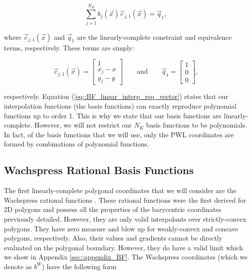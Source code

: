 \begin{equation}
\sum_{j=1}^{N_K}  b_j (\vec{x}) \vec{c}_{j,1}(\vec{x}) = \vec{q}_1 ,
\label{eq::BF_linear_interp_req_vector}
\end{equation}

\noindent where $\vec{c}_{j,1}(\vec{x})$ and $\vec{q}_1$ are the linearly-complete constraint and equivalence terms, respectively. These terms are simply:

\begin{equation}
\vec{c}_{j,1}(\vec{x}) = \left[
\begin{array}{c}
1 \\
x_j - x \\
y_j - y
\end{array} \right]
  \qquad \text{and} \qquad \vec{q}_1 = \left[
\begin{array}{c}
1 \\
0 \\
0
\end{array} \right],
\label{eq::BF_linear_constraint_terms}
\end{equation}

\noindent respectively. Equation (\ref{eq::BF_linear_interp_req_vector}) states that our interpolation functions (the basis functions) can exactly reproduce polynomial functions up to order 1. This is why we state that our basis functions are linearly-complete. However, we will not restrict our $N_K$ basis functions to be polynomials. In fact, of the basis functions that we will use, only the PWL coordinates are formed by combinations of polynomial functions.


\subsection{Wachspress Rational Basis Functions}
\label{sec::BF_2DLinear_Wachspress}

The first linearly-complete polygonal coordinates that we will consider are the Wachspress rational functions \cite{wachspress1975rational}. These rational functions were the first derived for 2D polygons and possess all the properties of the barycentric coordinates previously detailed. However, they are only valid interpolants over strictly-convex polygons. They have zero measure and blow up for weakly-convex and concave polygons, respectively. Also, their values and gradients cannot be directly evaluated on the polygonal boundary. However, they do have a valid limit which we show in Appendix \ref{sec::appendix_BF}. The Wachspress coordinates (which we denote as $b^W$) have the following form

